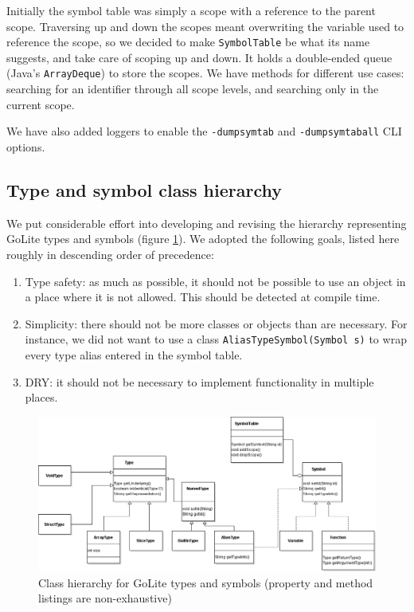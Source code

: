 \documentclass[oneside]{article}
\begin{document}
Initially the symbol table was simply a scope with a reference to the parent scope. Traversing up and down the scopes meant overwriting the variable used to reference the scope, so we decided to make \texttt{SymbolTable} be what its name suggests, and take care of scoping up and down. It holds a double-ended queue (Java's \texttt{ArrayDeque}) to store the scopes. We have methods for different use cases: searching for an identifier through all scope levels, and searching only in the current scope.

We have also added loggers to enable the \verb|-dumpsymtab| and \verb|-dumpsymtaball| CLI options.

\subsection{Type and symbol class hierarchy}

We put considerable effort into developing and revising the hierarchy representing GoLite types and symbols (figure \ref{fig:symbol_table_uml}). We adopted the following goals, listed here roughly in descending order of precedence:

\begin{enumerate}
    \item Type safety: as much as possible, it should not be possible to use an object in a place where it is not allowed. This should be detected at compile time.
    \item Simplicity: there should not be more classes or objects than are necessary. For instance, we did not want to use a class \texttt{AliasTypeSymbol(Symbol s)} to wrap every type alias entered in the symbol table.
    \item DRY: it should not be necessary to implement functionality in multiple places.
\end{enumerate}

\begin{figure}
    \includegraphics[width=\textwidth]{symbol_table_uml}
    \caption{Class hierarchy for GoLite types and symbols (property and method listings are non-exhaustive)}
    \label{fig:symbol_table_uml}
\end{figure}
\end{document}
